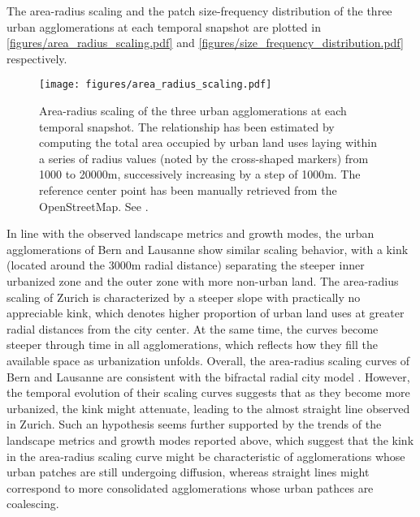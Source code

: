 The area-radius scaling and the patch size-frequency distribution of the three urban agglomerations at each temporal snapshot are plotted in \autoref{figures/area_radius_scaling.pdf} and \autoref{figures/size_frequency_distribution.pdf} respectively.

\begin{figure}[!ht]
  \begin{adjustwidth}{0cm}{-.4\textwidth}
    \centering
    \texttt{[image: figures/area\_radius\_scaling.pdf]}
    \vspace{.5em}
    \caption[Area-radius scaling]{\label{figures/area_radius_scaling.pdf}Area-radius scaling of the three urban agglomerations at each temporal snapshot. The relationship has been estimated by computing the total area occupied by urban land uses laying within a series of radius values (noted by the cross-shaped markers) from 1000 to 20000m, successively increasing by a step of 1000m. The reference center point has been manually retrieved from the OpenStreetMap\footnotemark. See .} %
  \end{adjustwidth}
\end{figure}


In line with the observed landscape metrics and growth modes, the urban agglomerations of Bern and Lausanne show similar scaling behavior, with a kink (located around the 3000m radial distance) separating the steeper inner urbanized zone and the outer zone with more non-urban land.
The area-radius scaling of Zurich is characterized by a steeper slope with practically no appreciable kink, which denotes higher proportion of urban land uses at greater radial distances from the city center.
At the same time, the curves become steeper through time in all agglomerations, which reflects how they fill the available space as urbanization unfolds.
Overall, the area-radius scaling curves of Bern and Lausanne are consistent with the bifractal radial city model \citep{white1993cellular,white2015modeling}.
However, the temporal evolution of their scaling curves suggests that as they become more urbanized, the kink might attenuate, leading to the almost straight line observed in Zurich.
Such an hypothesis seems further supported by the trends of the landscape metrics and growth modes reported above, which suggest that the kink in the area-radius scaling curve might be characteristic of agglomerations whose urban patches are still undergoing diffusion, whereas straight lines might correspond to more consolidated agglomerations whose urban pathces are coalescing.

